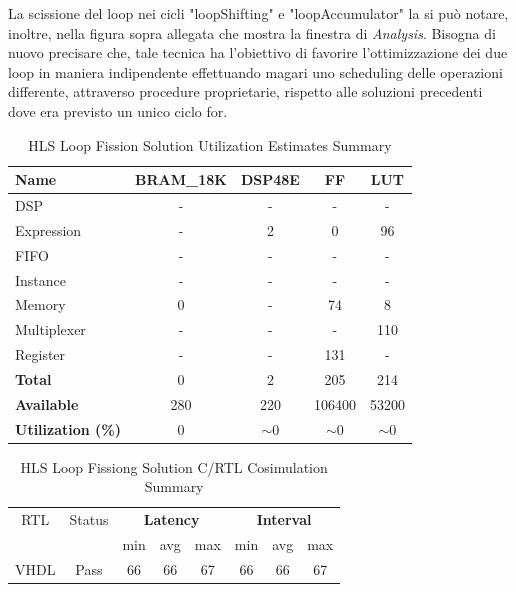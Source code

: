 La scissione del loop nei cicli "loopShifting" e "loopAccumulator" la si può notare, inoltre, nella figura sopra allegata che mostra la finestra di \textit{Analysis}. Bisogna di nuovo precisare che, tale tecnica ha l'obiettivo di favorire l'ottimizzazione dei due loop in maniera indipendente effettuando magari uno scheduling delle operazioni differente, attraverso procedure proprietarie, rispetto alle soluzioni precedenti dove era previsto un unico ciclo for. 

\begin{table}[h]
    \centering
    \begin{tabular}{|l|c|c|c|c|}
        \hline
        \textbf{Name}    & \textbf{BRAM\_18K} & \textbf{DSP48E} & \textbf{FF} & \textbf{LUT} \\ \hline
        DSP              & -                   & -               & -           & -            \\ 
        Expression       & -                   & 2               & 0           & 96          \\ 
        FIFO             & -                   & -               & -           & -            \\ 
        Instance         & -                   & -               & -           & -            \\ 
        Memory           & 0                   & -               & 74          & 8            \\ 
        Multiplexer      & -                   & -               & -           & 110          \\ 
        Register         & -                   & -               & 131         & -            \\ \hline
        \textbf{Total}   & 0                   & 2               & 205         & 214          \\ \hline
        \textbf{Available} & 280               & 220             & 106400      & 53200        \\ \hline
        \textbf{Utilization (\%)} & 0            & $\sim$0               & $\sim$0     & $\sim$0      \\ \hline
    \end{tabular}
    \caption{HLS Loop Fission Solution Utilization Estimates Summary}
    \label{tab:hls-loop-fission-solution-utilization-estimates-summary}
\end{table}

\begin{table}[H]
    \centering
    \begin{tabular}{|c|c|c|c|c|c|c|c|}
        \hline
        \multicolumn{1}{|c|}{RTL} & \multicolumn{1}{|c|}{Status} & \multicolumn{3}{c|}{\textbf{Latency}} & \multicolumn{3}{c|}{\textbf{Interval}} \\
        &  & min & avg & max & min & avg & max \\
        \hline
        VHDL & Pass & 66 & 66 & 67 & 66 & 66 & 67 \\
        \hline
    \end{tabular}
    \caption{HLS Loop Fissiong Solution C/RTL Cosimulation Summary }
    \label{tab:hls-loop-fission-solution-cosimulation-summary}
\end{table}

